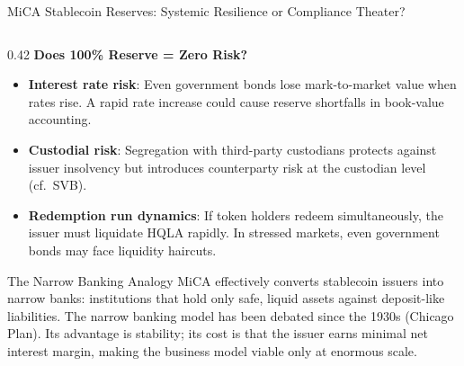 \begin{frame}{MiCA Stablecoin Reserves: Systemic Resilience or Compliance Theater?}
\begin{columns}[T]
\begin{column}{0.42\textwidth}
      \textbf{Does 100\% Reserve = Zero Risk?}
      \begin{itemize}
        \item \textbf{Interest rate risk}: Even government bonds lose mark-to-market value when rates rise. A rapid rate increase could cause reserve shortfalls in book-value accounting.
        \item \textbf{Custodial risk}: Segregation with third-party custodians protects against issuer insolvency but introduces counterparty risk at the custodian level (cf.\ SVB).
        \item \textbf{Redemption run dynamics}: If token holders redeem simultaneously, the issuer must liquidate HQLA rapidly. In stressed markets, even government bonds may face liquidity haircuts.
      \end{itemize}
      \vspace{0.2em}
      \begin{exampleblock}{The Narrow Banking Analogy}
        MiCA effectively converts stablecoin issuers into narrow banks: institutions that hold only safe, liquid assets against deposit-like liabilities. The narrow banking model has been debated since the 1930s (Chicago Plan). Its advantage is stability; its cost is that the issuer earns minimal net interest margin, making the business model viable only at enormous scale.
      \end{exampleblock}
    \end{column}
  \end{columns}
\end{frame}


